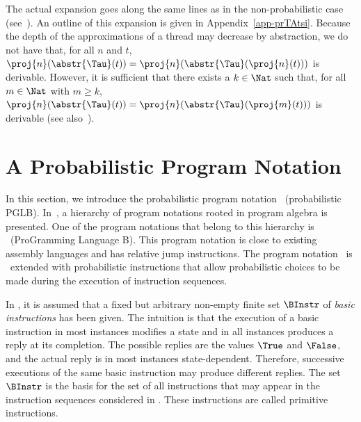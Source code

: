 \documentclass{llncs}
\begin{document}
The actual expansion goes along the same lines as in the 
non-probabilistic case (see~\cite{BM12b}).
An outline of this expansion is given in Appendix~\ref{app-prTAtsi}.
Because the depth of the approximations of a thread may decrease by 
abstraction, we do not have that, for all $n$ and $t$,
$\proj{n}(\abstr{\Tau}(t)) = \proj{n}(\abstr{\Tau}(\proj{n}(t)))$
is derivable.
However, it is sufficient that there exists a $k \in \Nat$ such that, 
for all $m \in \Nat$ with $m \geq k$, 
$\proj{n}(\abstr{\Tau}(t)) = \proj{n}(\abstr{\Tau}(\proj{m}(t)))$ 
is derivable (see also~\cite{BM12b}).

\section{A Probabilistic Program Notation}
\label{sect-prPGLB}

In this section, we introduce the probabilistic program notation 
\prPGLB\ (probabilistic PGLB).
In~\cite{BL02a}, a hierarchy of program notations rooted in program
algebra is presented.
One of the program notations that belong to this hierarchy is \PGLB\
(ProGramming Language B).
This program notation is close to existing assembly languages and has
relative jump instructions.
The program notation \prPGLB\ is \PGLB\ extended with probabilistic 
instructions that allow probabilistic choices to be made during the 
execution of instruction sequences. 

In \prPGLB, it is assumed that a fixed but arbitrary non-empty finite
set $\BInstr$ of \emph{basic instructions} has been given.
The intuition is that the execution of a basic instruction in most
instances modifies a state and in all instances produces a reply at its
completion.
The possible replies are the values $\True$ and $\False$, and the actual 
reply is in most instances state-dependent.
Therefore, successive executions of the same basic instruction may
produce different replies.
The set $\BInstr$ is the basis for the set of all instructions that may
appear in the instruction sequences considered in \prPGLB.
These instructions are called primitive instructions.
\end{document}
